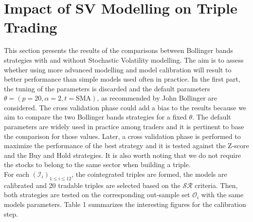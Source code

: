 \documentclass[11pt,a4,twosided,singlespacing,titlepagenumber=on]{scrreprt}
\numberwithin{equation}{chapter} %
\theoremstyle{remark}
\begin{document}
\section{Impact of SV Modelling on Triple Trading}
This section presents the results of the comparisons between Bollinger bands strategies with and without Stochastic Volatility modelling. The aim is to assess whether using more advanced modelling and model calibration will result to better performance than simple models used often in practice. In the first part, the tuning of the parameters is discarded and the default parameters $\theta = (p=20, \alpha = 2, t = \text{SMA})$, as recommended by John Bollinger are considered. The cross validation phase could add a bias to the results because we aim to compare the two Bollinger bands strategies for a fixed $\theta$. The default parameters are widely used in practice among traders and it is pertinent to base the comparison for those values. Later, a cross validation phase is performed to maximize the performance of the best strategy and it is tested against the Z-score and the Buy and Hold strategies. It is also worth noting that we do not require the stocks to belong to the same sector when building a triple. \\

For each $(\mathcal{I}_i)_{1 \leq i \leq 12}$, the cointegrated triples are formed, the models are calibrated and 20 tradable triples are selected based on the $\mathcal{SR}$ criteria. Then, both strategies are tested on the corresponding out-sample set $\mathcal{O}_i$ with the same models parameters. Table 1 summarizes the interesting figures for the calibration step.\\
\end{document}
